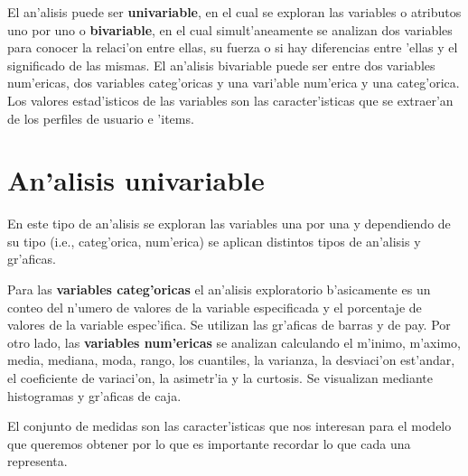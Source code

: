 El an'alisis puede ser \textbf{univariable}, en el cual se exploran las variables o atributos uno por uno o \textbf{bivariable}, en el cual simult'aneamente se analizan dos variables para conocer la relaci'on entre ellas, su fuerza o si hay diferencias entre 'ellas y el significado de las mismas. El an'alisis bivariable puede ser entre dos variables num'ericas, dos variables categ'oricas y una vari'able num'erica y una categ'orica.
Los valores estad'isticos de las variables son las caracter'isticas  que se extraer'an de los perfiles de usuario e 'items.

\section{An'alisis univariable}
En este tipo de an'alisis se exploran las variables una por una y dependiendo de su tipo (i.e., categ'orica, num'erica) se aplican distintos tipos de an'alisis y gr'aficas.

Para las \textbf{variables categ'oricas} el an'alisis exploratorio b'asicamente es un conteo del n'umero de valores de la variable especificada y el porcentaje de valores de la variable espec'ifica. Se utilizan las gr'aficas de barras y de pay. Por otro lado, las \textbf{variables num'ericas} se analizan calculando el m'inimo, m'aximo, media, mediana, moda, rango, los cuantiles, la varianza, la desviaci'on est'andar, el coeficiente de variaci'on, la asimetr'ia y la curtosis. Se visualizan mediante histogramas y gr'aficas de caja.


El conjunto de medidas son las caracter'isticas que nos interesan para el modelo que queremos obtener por lo que es importante recordar lo que cada una representa. 

